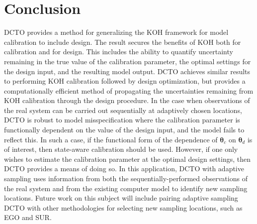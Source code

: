 \documentclass[12pt]{article}
\begin{document}
%
\section{Conclusion}\label{sec:conclusion}
%
DCTO provides a method for generalizing the KOH framework for model calibration to include design.
%
The result secures the benefits of KOH both for calibration and for design.
%
This includes the ability to quantify uncertainty remaining in the true value of the calibration parameter, the optimal settings for the design input, and the resulting model output.
%
DCTO achieves similar results to performing KOH calibration followed by design optimization, but provides a computationally efficient method of propagating the uncertainties remaining from KOH calibration through the design procedure.
%
In the case when observations of the real system can be carried out sequentially at adaptively chosen locations, DCTO is robust to model misspecification where the calibration parameter is functionally dependent on the value of the design input, and the model fails to reflect this.
%
In such a case, if the functional form of  the dependence of $\boldsymbol\theta_c$ on $\boldsymbol\theta_d$ is of interest, then state-aware calibration should be used.
%
However, if one only wishes to estimate the calibration parameter at the optimal design settings, then DCTO provides a means of doing so.
%
In this application, DCTO with adaptive sampling uses information from both the sequentially-performed observations of the real system and from the existing computer model to identify new sampling locations.
%
Future work on this subject will include pairing adaptive sampling DCTO with other methodologies for selecting new sampling locations, such as EGO and SUR.
%


\bigskip

%
%
%
%




\end{document}
